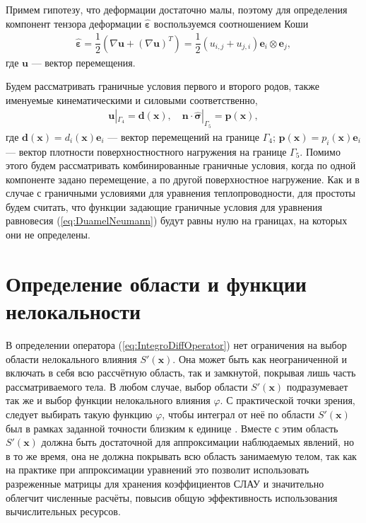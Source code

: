 Примем гипотезу, что деформации достаточно малы, поэтому для определения компонент тензора деформации $\widehat{\boldsymbol{\varepsilon}}$ воспользуемся соотношением \mbox{Коши \cite{MSS}}
\begin{gather*}
	\widehat{\boldsymbol{\varepsilon}} = 
	\dfrac{1}{2} \left( \nabla \boldsymbol{u} + (\nabla \boldsymbol{u})^T \right) = 
	\dfrac{1}{2} (u_{i, j} + u_{j, i}) \boldsymbol{e}_i \otimes \boldsymbol{e}_j,
\end{gather*}
где $\boldsymbol{u}$ --- вектор перемещения.

Будем рассматривать граничные условия первого и второго родов, также именуемые кинематическими и силовыми соответственно,
\begin{gather}
	\label{eq:StressBoundaries}
	\boldsymbol{u}|_{\Gamma_4} = \boldsymbol{d} (\boldsymbol{x}),
	\quad
	\boldsymbol{n} \cdot \widehat{\boldsymbol{\sigma}}|_{\Gamma_5} = \boldsymbol{p} (\boldsymbol{x}),
\end{gather}
где $\boldsymbol{d} (\boldsymbol{x}) = d_i (\boldsymbol{x}) \boldsymbol{e}_i$ --- вектор перемещений на границе $\Gamma_4$;
$\boldsymbol{p} (\boldsymbol{x}) = p_i (\boldsymbol{x}) \boldsymbol{e}_i$ --- вектор плотности поверхностностного нагружения на границе $\Gamma_5$. Помимо этого будем рассматривать комбинированные граничные условия, когда по одной компоненте задано перемещение, а по другой поверхностное нагружение. Как и в случае с граничными условиями для уравнения теплопроводности, для простоты будем считать, что функции задающие граничные условия для уравнения равновесия (\ref{eq:DuamelNeumann}) будут равны нулю на границах, на которых они не определены.

\section{Определение области и функции нелокальности}\label{sec:BasicRelations/InfluenceFunction}

В определении оператора (\ref{eq:IntegroDiffOperator}) нет ограничения на выбор области нелокального влияния $S'(\boldsymbol{x})$. Она  может быть как неограниченной и включать в себя всю рассчётную область, так и замкнутой, покрывая лишь часть рассматриваемого тела. В любом случае, выбор области $S'(\boldsymbol{x})$ подразумевает так же и выбор функции нелокального влияния $\varphi$. С практической точки зрения, следует выбирать такую функцию $\varphi$, чтобы интеграл от неё по области $S'(\boldsymbol{x})$ был в рамках заданной точности близким к единице \cite{Eringen3}. Вместе с этим область $S'(\boldsymbol{x})$ должна быть достаточной для аппроксимации наблюдаемых явлений, но в то же время, она не должна покрывать всю область занимаемую телом, так как на практике при аппроксимации уравнений это позволит использовать разреженные матрицы для хранения коэффициентов СЛАУ \cite{Pisanetzkiy} и значительно облегчит численные расчёты, повысив общую эффективность использования вычислительных ресурсов. 

